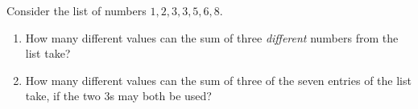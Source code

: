 Consider the list of numbers $1,2,3,3,5,6,8$.
\begin{enumerate}
\item[(a)] How many different values can the sum of three \emph{different} numbers from the list take?
\item[(b)] How many different values can the sum of three of the seven entries of the list take, if the two $3$s may both be used?
\end{enumerate}
